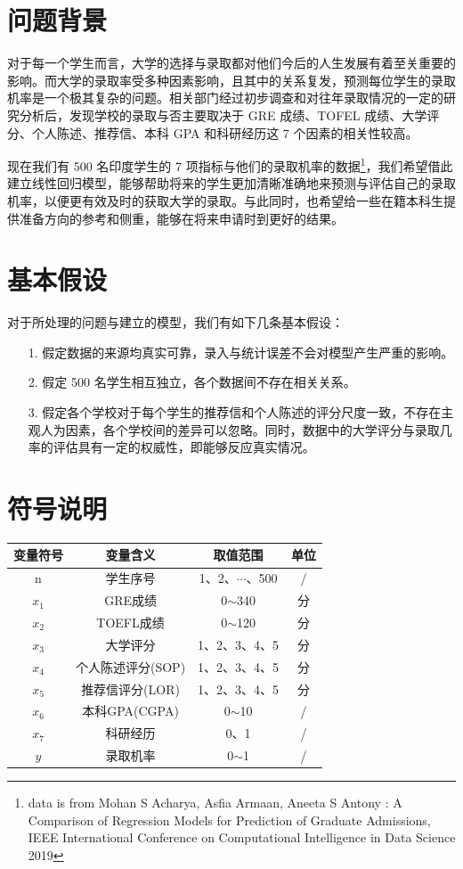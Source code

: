\documentclass[11pt]{article}
\begin{document}
\section{问题背景}
对于每一个学生而言，大学的选择与录取都对他们今后的人生发展有着至关重要的影响。而大学的录取率受多种因素影响，且其中的关系复发，预测每位学生的录取机率是一个极其复杂的问题。相关部门经过初步调查和对往年录取情况的一定的研究分析后，发现学校的录取与否主要取决于 GRE 成绩、TOFEL 成绩、大学评分、个人陈述、推荐信、本科 GPA 和科研经历这 7 个因素的相关性较高。

现在我们有 500 名印度学生的 7 项指标与他们的录取机率的数据\footnote{data is from Mohan S Acharya, Asfia Armaan, Aneeta S Antony : A Comparison of Regression Models for Prediction of Graduate Admissions, IEEE International Conference on Computational Intelligence in Data Science 2019}，我们希望借此建立线性回归模型，能够帮助将来的学生更加清晰准确地来预测与评估自己的录取机率，以便更有效及时的获取大学的录取。与此同时，也希望给一些在籍本科生提供准备方向的参考和侧重，能够在将来申请时到更好的结果。
\section{基本假设}
对于所处理的问题与建立的模型，我们有如下几条基本假设：
\begin{itemize}
	\item[1.] 假定数据的来源均真实可靠，录入与统计误差不会对模型产生严重的影响。
	\item[2.] 假定 500 名学生相互独立，各个数据间不存在相关关系。
	\item[3.] 假定各个学校对于每个学生的推荐信和个人陈述的评分尺度一致，不存在主观人为因素，各个学校间的差异可以忽略。同时，数据中的大学评分与录取几率的评估具有一定的权威性，即能够反应真实情况。
\end{itemize}
\section{符号说明}
\begin{longtable}[H]{cccc}
	\hline
	变量符号&变量含义&取值范围&单位\\
	\hline
	n&学生序号&1、2、$\cdots$、500&/\\
	$x_1$&GRE成绩& 0$\sim$340&分\\
	$x_2$&TOEFL成绩&0$\sim$120&分\\
	$x_3$&大学评分&1、2、3、4、5&分\\
	$x_4$&个人陈述评分(SOP)&1、2、3、4、5&分\\
	$x_5$&推荐信评分(LOR)&1、2、3、4、5&分\\
	$x_6$&本科GPA(CGPA)&0$\sim$10&/\\
	$x_7$&科研经历&0、1&/\\
	$y$&录取机率&0$\sim$1&/\\
	\hline
\end{longtable}
\end{document}
